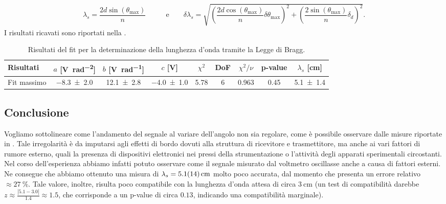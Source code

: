 \documentclass[a4paper]{article}
\begin{document}
\begin{align}
  \lambda_s = \dfrac{2d \sin(\theta_{\text{max}})}{n} \qquad & \text{e}\qquad
  \delta \lambda_s = \sqrt{\left( \dfrac{2d \cos(\theta_{\text{max}})}{n}\delta \theta_{\text{max}}\right)^2 + \left(\dfrac{2\sin(\theta_{\text{max}})}{n}\delta_d\right)^2}. \label{eq:lunghezza_bragg}
\end{align}
I risultati ricavati sono riportati nella .
\begin{table}[htbp]
\centering
\caption{Risultati del fit per la determinazione della lunghezza d'onda tramite la Legge di Bragg.}
\label{tab:fit_bragg}
\begin{tabular}{|l|cccccccc|}
\hline
Risultati & $a$ [\si{\volt\per\radian\squared}]& $b$ [\si{\volt\per\radian}]& $c$ [\si{\volt}]& $\chi^2$ & DoF & $\chi^2/\nu$ & p-value & $\lambda_s$ [\si{\centi\metre}]  \\\hline\hline
Fit massimo & \SI{-8.3 \pm 2.0}{} & \SI{12.1 \pm 2.8}{} & \SI{-4.0 \pm 1.0}{} & 5.78 & 6 & 0.963 & 0.45 & \SI{5.1 \pm 1.4}{}\\\hline
\end{tabular}
\end{table}

\subsection{Conclusione}
Vogliamo sottolineare come l'andamento del segnale al variare dell'angolo non sia regolare, come è possibile osservare dalle misure riportate in . Tale irregolarità è da imputarsi agli effetti di bordo dovuti alla struttura di ricevitore e trasmettitore, ma anche ai vari fattori di rumore esterno, quali la presenza di dispositivi elettronici nei pressi della strumentazione o l'attività degli apparati sperimentali circostanti. Nel corso dell'esperienza abbiamo infatti potuto osservare come il segnale misurato dal voltmetro oscillasse anche a causa di fattori esterni. Ne consegue che abbiamo ottenuto una misura di $\lambda_s = \SI{5.1 \pm 1.4}{\centi\metre}$ molto poco accurata, dal momento che presenta un errore relativo $\approx \SI{27}{\percent}$. Tale valore, inoltre, risulta poco compatibile con la lunghezza d'onda attesa di circa $\SI{3}{\centi\metre}$ (un test di compatibilità darebbe $z \approx \frac{|5.1-3.0|}{1.4} \approx 1.5$, che corrisponde a un p-value di circa $0.13$, indicando una compatibilità marginale).
\end{document}
